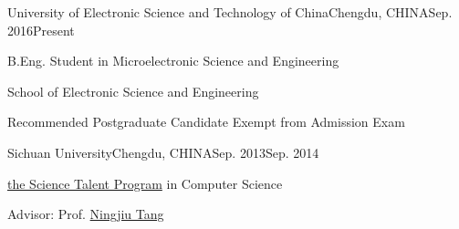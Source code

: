 
\begin{eduitem}{University of Electronic Science and Technology of China}{Chengdu, CHINA}{Sep. 2016}{Present}
\item B.Eng. Student in Microelectronic Science and Engineering
\item School of Electronic Science and Engineering
\item Recommended Postgraduate Candidate Exempt from Admission Exam
\end{eduitem}

\begin{eduitem}{Sichuan University}{Chengdu, CHINA}{Sep. 2013}{Sep. 2014}
\item \href{http://ycjh.org}{the Science Talent Program} in Computer Science 
\item Advisor: Prof. \href{http://cs.scu.edu.cn/info/1074/3930.htm}{Ningjiu Tang}
\end{eduitem}

\endinput
